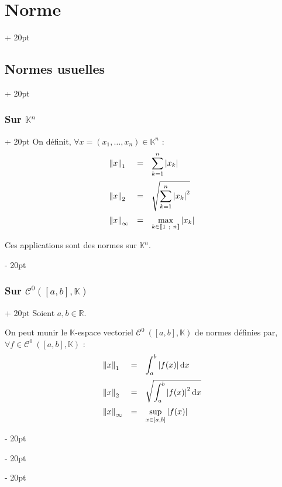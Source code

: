 \documentclass[a4paper, 12pt, twoside]{article}
\newcommand{\R}{\mathbb{R}} %
\newcommand{\K}{\mathbb K}
\newcommand{\nset}[2]{\left\llbracket #1\ ;\ #2 \right\rrbracket}
\newcommand{\dint}[4][x]{\displaystyle \int_{#2}^{#3} #4 \mathrm{d} #1} %
\newcommand{\lr}[1]{\left( #1 \right)}
\newcommand{\abs}[1]{\left\lvert #1 \right\rvert}
\newcommand{\norm}[1]{\left\lVert #1 \right\rVert}
\newcommand{\ind}[1][20pt]{\advance\leftskip + #1}
\newcommand{\deind}[1][20pt]{\advance\leftskip - #1}
\newenvironment{indt}[2][20pt]{#2 \par \ind[#1]}{\par \deind} %
\begin{document}
\begin{indt}{\section{Norme}}
\begin{indt}{\subsection{Normes usuelles}}
\begin{indt}{\subsubsection{Sur $\K^n$}}
                On définit, $\forall x = (x_1, \ldots, x_n) \in \K^n$ :
                \[
                    \begin{array}{lcl}
                        \norm{x}_1
                        &=& \displaystyle
                        \sum_{k = 1}^n \abs{x_k}
                        \vspace{6pt}
                        \\
                        \norm{x}_2
                        &=& \displaystyle
                        \sqrt{\sum_{k = 1}^n \abs{x_k}^2}
                        \vspace{6pt}
                        \\
                        \norm{x}_\infty
                        &=& \displaystyle
                        \max_{k \in \nset 1 n} \abs{x_k}
                    \end{array}
                \]

                Ces applications sont des normes sur $\K^n$.
            \end{indt}

            \vspace{12pt}
            
            \begin{indt}{\subsubsection{Sur $\mathcal C^0\!\lr{[a, b], \K}$}}
                Soient $a, b \in \R$.

                On peut munir le $\K$-espace vectoriel $\mathcal C^0\:\lr{[a, b], \K}$ de normes définies par, $\forall f \in \mathcal C^0\:\lr{[a, b], \K}$ :
                \[
                    \begin{array}{lcl}
                        \norm{x}_1
                        &=& \displaystyle
                        \dint a b {\abs{f(x)}}
                        \vspace{6pt}
                        \\
                        \norm{x}_2
                        &=& \displaystyle
                        \sqrt{\dint a b {\abs{f(x)}^2}}
                        \vspace{6pt}
                        \\
                        \norm{x}_\infty
                        &=& \displaystyle
                        \sup_{x \in [a, b]} \abs{f(x)}
                    \end{array}
                \]
            \end{indt}
        \end{indt}


\end{indt}
\end{document}

